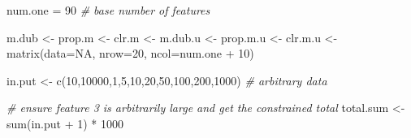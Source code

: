 \documentclass[
  onecolumn]{article}
\newenvironment{Shaded}{\begin{snugshade}}{\end{snugshade}}
\newcommand{\AttributeTok}[1]{\textcolor[rgb]{0.77,0.63,0.00}{#1}}
\newcommand{\CommentTok}[1]{\textcolor[rgb]{0.56,0.35,0.01}{\textit{#1}}}
\newcommand{\ConstantTok}[1]{\textcolor[rgb]{0.00,0.00,0.00}{#1}}
\newcommand{\DecValTok}[1]{\textcolor[rgb]{0.00,0.00,0.81}{#1}}
\newcommand{\FunctionTok}[1]{\textcolor[rgb]{0.00,0.00,0.00}{#1}}
\newcommand{\NormalTok}[1]{#1}
\newcommand{\OtherTok}[1]{\textcolor[rgb]{0.56,0.35,0.01}{#1}}
\newcommand{\SpecialCharTok}[1]{\textcolor[rgb]{0.00,0.00,0.00}{#1}}
\begin{document}
\begin{Shaded}
\begin{Highlighting}[]
\NormalTok{num.one }\OtherTok{=} \DecValTok{90} \CommentTok{\# base number of features}

\NormalTok{m.dub }\OtherTok{\textless{}{-}}\NormalTok{ prop.m }\OtherTok{\textless{}{-}}\NormalTok{ clr.m }\OtherTok{\textless{}{-}}\NormalTok{ m.dub.u }\OtherTok{\textless{}{-}}\NormalTok{ prop.m.u }\OtherTok{\textless{}{-}}\NormalTok{ clr.m.u }\OtherTok{\textless{}{-}}
    \FunctionTok{matrix}\NormalTok{(}\AttributeTok{data=}\ConstantTok{NA}\NormalTok{, }\AttributeTok{nrow=}\DecValTok{20}\NormalTok{, }\AttributeTok{ncol=}\NormalTok{num.one }\SpecialCharTok{+} \DecValTok{10}\NormalTok{)}

\NormalTok{in.put }\OtherTok{\textless{}{-}} \FunctionTok{c}\NormalTok{(}\DecValTok{10}\NormalTok{,}\DecValTok{10000}\NormalTok{,}\DecValTok{1}\NormalTok{,}\DecValTok{5}\NormalTok{,}\DecValTok{10}\NormalTok{,}\DecValTok{20}\NormalTok{,}\DecValTok{50}\NormalTok{,}\DecValTok{100}\NormalTok{,}\DecValTok{200}\NormalTok{,}\DecValTok{1000}\NormalTok{) }\CommentTok{\# arbitrary data}

\CommentTok{\# ensure feature 3 is arbitrarily large and get the constrained total}
\NormalTok{total.sum }\OtherTok{\textless{}{-}} \FunctionTok{sum}\NormalTok{(in.put }\SpecialCharTok{+} \DecValTok{1}\NormalTok{) }\SpecialCharTok{*} \DecValTok{1000}


\end{Highlighting}
\end{Shaded}
\end{document}
